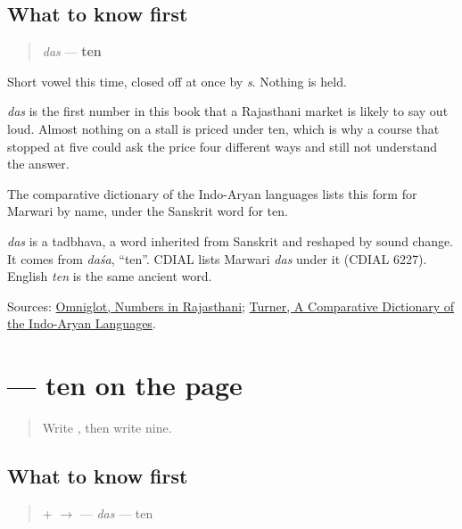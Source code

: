 \subsection*{What to know first}
\begin{quote}
\emph{das} — \textbf{ten}
\end{quote}

Short vowel this time, closed off at once by \emph{s}. Nothing is held.

\emph{das} is the first number in this book that a Rajasthani market is likely to say out loud. Almost nothing on a stall is priced under ten, which is why a course that stopped at five could ask the price four different ways and still not understand the answer.

The comparative dictionary of the Indo-Aryan languages lists this form for Marwari by name, under the Sanskrit word for ten.

\begin{cousinweb}
\emph{das} is a tadbhava, a word inherited from Sanskrit and reshaped by sound change. It comes from \emph{daśa}, \textquotedblleft{}ten\textquotedblright{}. CDIAL lists Marwari \emph{das} under it (CDIAL 6227). English \emph{ten} is the same ancient word.
\end{cousinweb}

\begin{tcolorbox}[breakable,colback=teal!4,colframe=teal!35!black,title={Before you move on}]
Sources: \href{https://www.omniglot.com/language/numbers/rajasthani.htm}{Omniglot, Numbers in Rajasthani}; \href{https://dsal.uchicago.edu/dictionaries/soas/}{Turner, A Comparative Dictionary of the Indo-Aryan Languages}.
\end{tcolorbox}
\section[\texorpdfstring{\mw{दस} (das)}{दस (das)}]{ — ten on the page}

\label{lesson:MW-C33-das}



\begin{quote}
Write \textbf{}, then write nine.
\end{quote}

\subsection*{What to know first}
\begin{quote}
\textbf{} + \textbf{} $\to$ \textbf{} — \emph{das} — ten
\end{quote}


